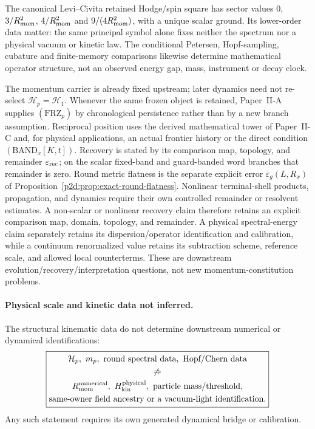 \documentclass[12pt,a4paper]{article}
\begin{document}
The canonical Levi--Civita retained Hodge/spin square has sector
values $0$, $3/R_{\mathrm{mom}}^2$, $4/R_{\mathrm{mom}}^2$ and $9/(4R_{\mathrm{mom}}^2)$, with a unique
scalar ground. Its lower-order data matter: the same principal symbol
alone fixes neither the spectrum nor a physical vacuum or kinetic law.
The conditional Petersen, Hopf-sampling, cubature and finite-memory
comparisons likewise determine mathematical operator structure, not
an observed energy gap, mass, instrument or decay clock.
\begin{remark}
The momentum carrier is already fixed upstream; later dynamics need not
re-select \(\mathcal H_p=\mathcal H_1\).  Whenever the same frozen object is
retained, Paper~II-A supplies \((\mathrm{FRZ}_p)\) by chronological
persistence rather than by a new branch assumption.  Reciprocal position uses the
derived mathematical tower of Paper~II-C and, for physical applications, an
actual frontier history or the direct condition
\((\mathrm{BAND}_x[K,t])\).  Recovery is stated by its comparison map,
topology, and remainder \(\varepsilon_{\rm rec}\); on the scalar fixed-band
and guard-banded word branches that remainder is zero.  Round metric
flatness is the separate explicit error \(\varepsilon_g(L,R_x)\) of
Proposition~\ref{p2d:prop:exact-round-flatness}.  Nonlinear terminal-shell
products, propagation, and dynamics require their own controlled remainder
or resolvent estimates.  A non-scalar or nonlinear recovery claim therefore
retains an explicit comparison map, domain, topology, and remainder.  A
physical spectral-energy claim separately retains its dispersion/operator
identification and calibration, while a continuum renormalized value retains
its subtraction scheme, reference scale, and allowed local counterterms.
These are downstream evolution/recovery/interpretation questions, not new
momentum-constitution problems.
\end{remark}

\paragraph{Physical scale and kinetic data not inferred.}
The structural kinematic data do not determine downstream numerical or
dynamical identifications:
\[
 \boxed{\begin{gathered}
 \mathcal H_p,\ m_p,\ \text{round spectral data},\ \text{Hopf/Chern data}\\
 \not\Rightarrow\\
 R_{\mathrm{mom}}^{\rm numerical},\ H_{\rm kin}^{\rm physical},\
 \text{particle mass/threshold},\\
 \text{same-owner field ancestry or a vacuum-light identification}.
 \end{gathered}}
\]
Any such statement requires its own generated dynamical bridge or calibration.
\end{document}
